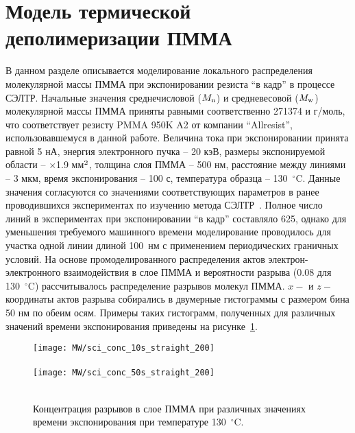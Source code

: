\section{Модель термической деполимеризации ПММА}

В данном разделе описывается моделирование локального распределения молекулярной массы ПММА при экспонировании резиста ``в кадр'' в процессе СЭЛТР. Начальные значения среднечисловой ($M_\mathrm{n}$) и средневесовой ($M_\mathrm{w}$) молекулярной массы ПММА приняты равными соответственно 271374 и  г/моль, что соответствует резисту PMMA 950K A2 от компании ``Allresist'', использовавшемуся в данной работе. Величина тока при экспонировании принята равной 5 нА, энергия электронного пучка -- 20 кэВ, размеры экспонируемой области -- $\times$1.9 мм$^\text{2}$, толщина слоя ПММА -- 500 нм, расстояние между линиями -- 3 мкм, время экспонирования -- 100 с, температура образца -- 130~$^\circ$C. Данные значения согласуются со значениями соответствующих параметров в ранее проводившихся экспериментах по изучению метода СЭЛТР~\cite{Bruk_2016_mee}. Полное число линий в экспериментах при экспонировании ``в кадр'' составляло 625, однако для уменьшения требуемого машинного времени моделирование проводилось для участка одной линии длиной 100~нм с применением периодических граничных условий. На основе промоделированного распределения актов электрон-электронного взаимодействия в слое ПММА и вероятности разрыва (0.08 для 130~$^\circ$C) рассчитывалось распределение разрывов молекул ПММА. $x-$ и $z-$координаты актов разрыва собирались в двумерные гистограммы с размером бина 50 нм по обеим осям. Примеры таких гистограмм, полученных для различных значений времени экспонирования приведены на рисунке~\ref{fig:scission_hist}.

\begin{figure}[t]
	\begin{center}
		\texttt{[image: MW/sci\_conc\_10s\_straight\_200]} \\
		\vspace{-3.7em}  \vspace{2.7em} \\
		\texttt{[image: MW/sci\_conc\_50s\_straight\_200]} \\
		\vspace{-3.7em}  \vspace{3.7em} \\
	\end{center}
	\vspace{-2.5em}
	\caption{Концентрация разрывов в слое ПММА при различных значениях времени экспонирования при температуре 130~$^\circ$C.}
	\label{fig:scission_hist}
\end{figure}

